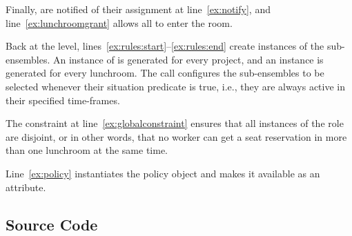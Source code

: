 Finally,  are notified of their assignment at line~\ref{ex:notify},
and line~\ref{ex:lunchroomgrant} allows all  to enter the room.

\medskip

Back at the  level, lines~\ref{ex:rules:start}--\ref{ex:rules:end}
create instances of the sub-ensembles. An instance of  is
generated for every project, and an instance  is generated for
every lunchroom. The  call configures the sub-ensembles to be selected
whenever their situation predicate is true, i.e., they are always active in their
specified time-frames.

The constraint at line~\ref{ex:globalconstraint} ensures that all instances of the
 role are disjoint, or in other words, that no worker can get a seat
reservation in more than one lunchroom at the same time.

Line~\ref{ex:policy} instantiates the policy object and makes it available as an
attribute.

\pagebreak

\subsection{Source Code}

